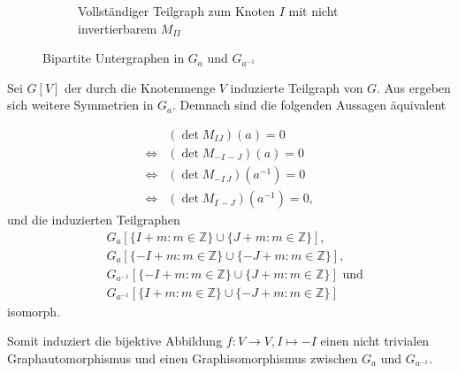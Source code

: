 \begin{figure}[]
\begin{subfigure}[b]{0.47\textwidth}
        \caption{Vollständiger Teilgraph zum Knoten $I$ mit nicht invertierbarem $M_{II}$}
        \label{fig:complete-graph}
    \end{subfigure}
    \caption{Bipartite Untergraphen in $G_a$ und $G_{a^{-1}}$}
    \label{fig:subgraphs}
\end{figure}

Sei $G[V]$ der durch die Knotenmenge $V$ induzierte Teilgraph von $G$. Aus  ergeben sich weitere Symmetrien in $G_a$. Demnach sind die folgenden Aussagen äquivalent

\begin{align*}
    &(\det{} M_{IJ})(a) = 0 \\
    \iff &(\det{} M_{-I\,-J})(a) = 0 \\
    \iff &(\det{} M_{-I\,J})(a^{-1}) = 0 \\
    \iff &(\det{} M_{I\,-J})(a^{-1}) = 0,
\end{align*}
und die induzierten Teilgraphen
\begin{align*}
    &G_a[\{I+m:m\in \mathbb{Z}\} \cup \{J+m:m\in \mathbb{Z}\}], \\
    &G_a[\{-I+m:m\in \mathbb{Z}\} \cup \{-J+m:m\in \mathbb{Z}\}], \\
    &G_{a^{-1}}[\{-I+m:m\in \mathbb{Z}\} \cup \{J+m:m\in \mathbb{Z}\}] \text{ und} \\
    &G_{a^{-1}}[\{I+m:m\in \mathbb{Z}\} \cup \{-J+m:m\in \mathbb{Z}\}]
\end{align*}
isomorph.

Somit induziert die bijektive Abbildung $f:V \to V, I \mapsto -I$ einen nicht trivialen Graphautomorphismus und einen Graphisomorphismus zwischen $G_a$ und $G_{a^{-1}}$.